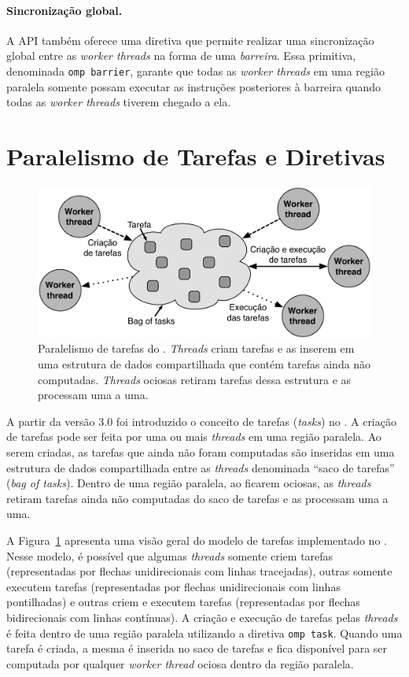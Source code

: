 \documentclass{SBCbookchapter}
\begin{document}
		\paragraph{Sincronização global.} A API \openmp também oferece uma
		diretiva que permite realizar uma sincronização global entre as
		\textit{worker threads} na forma de uma \textit{barreira}. Essa
		primitiva, denominada \texttt{omp barrier}, garante que todas as
		\textit{worker threads} em uma região paralela somente possam executar
		as instruções posteriores à barreira quando todas as \textit{worker threads}
		tiverem chegado a ela.
	
\section{Paralelismo de Tarefas e Diretivas \openmp}
\label{sec:paralelismo tarefas}

	\begin{figure}[t]
		\centering
		\includegraphics[width=0.6\linewidth]{img/tasks}
		\caption{Paralelismo de tarefas do \openmp. \textit{Threads} criam
		tarefas e as inserem em uma estrutura de dados compartilhada
		que contém tarefas ainda não computadas. \textit{Threads} ociosas 
		retiram tarefas dessa estrutura e as processam uma a uma.}
		\label{fig:tasks}
	\end{figure}

	A partir da versão 3.0 foi introduzido o conceito de tarefas
	(\textit{tasks}) no \openmp. A criação de tarefas pode ser feita por uma ou
	mais \textit{threads} em uma região paralela. Ao serem criadas, as
	tarefas que ainda não foram computadas são inseridas em uma
	estrutura de dados compartilhada entre as \textit{threads}
	denominada ``saco de tarefas'' (\textit{bag of tasks}). Dentro de
	uma região paralela, ao ficarem ociosas, as \textit{threads} retiram
	tarefas ainda não computadas do saco de tarefas e as processam uma a
	uma.
	
	A Figura~\ref{fig:tasks} apresenta uma visão geral do modelo de
	tarefas implementado no \openmp. Nesse modelo, é possível que
	algumas \textit{threads} somente criem tarefas (representadas por
	flechas unidirecionais com linhas tracejadas), outras somente executem
	tarefas (representadas por flechas unidirecionais com linhas pontilhadas)
	e outras criem e executem tarefas (representadas por
	flechas bidirecionais com linhas contínuas).  A criação e execução
	de tarefas pelas \textit{threads} é feita dentro de uma região
	paralela utilizando a diretiva \texttt{omp task}. Quando uma tarefa
	é criada, a mesma é inserida no saco de tarefas e fica disponível
	para ser computada por qualquer \textit{worker thread} ociosa dentro
	da região paralela.
\end{document}
